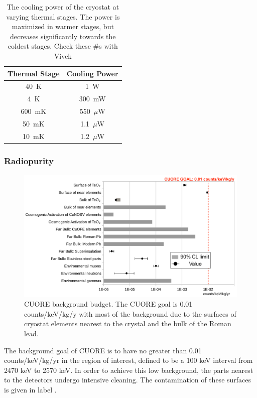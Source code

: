 \begin{table}[htbp]
    \centering
    \begin{tabular}{c|c}
    \hline
    \hline
    Thermal Stage     & Cooling Power  \\
    \hline
    40~K     & 1~W \\
    4~K      & 300~mW \\
    600~mK   & 550~$\mu$W \\
    50~mK    & 1.1~$\mu$W \\
    10~mK    & 1.2~$\mu$W \\
    \hline
    \hline
    \end{tabular}
    \caption[The cooling power of the cryostat at varying thermal stages.]
    {The cooling power of the cryostat at varying thermal stages.
    The power is maximized in warmer stages, but decreases significantly towards the coldest stages.
    \color{red}Check these \#s with Vivek \color{black}}
    \label{tab:cryostat_cooling_power}
\end{table}
\subsubsection*{Radiopurity}

\begin{figure}[htbp]
\centering
\includegraphics[width=0.7\linewidth]{Figures/CUORE_background_budget}
\caption[CUORE background budget.]
{CUORE background budget.
The CUORE goal is 0.01 counts/keV/kg/y with most of the background due to the surfaces of cryostat elements nearest to the crystal and the bulk of the Roman lead.}
\label{fig:cuore_background_budget}
\end{figure}

The background goal of CUORE is to have no greater than 0.01 counts/keV/kg/yr in the region of interest, defined to be a 100 keV interval from 2470 keV to 2570 keV.
In order to achieve this low background, the parts nearest to the detectors undergo intensive cleaning.
The contamination of these surfaces is given in \color{red} label \color{black}.